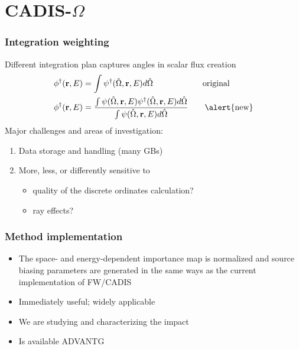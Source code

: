 \documentclass[handout]{beamer}
\renewcommand{\(}{\begin{columns}}
\renewcommand{\)}{\end{columns}}
\newcommand{\<}[1]{\begin{column}{#1}}
\renewcommand{\>}{\end{column}}
\newcommand{\vOmega}{\ensuremath{\hat{\Omega}}}
\newcommand{\ve}[1]{\ensuremath{\mathbf{#1}}}
\begin{document}
\section{\scshape CADIS-$\Omega$}
\begin{frame}[fragile]
  \frametitle{Integration weighting}

    Different integration plan captures angles in scalar flux creation	
	\begin{align*}
		\phi^{\dagger}(\ve{r},E) &= \int \psi^{\dagger}(\vOmega, 
		\ve{r},E) d\vOmega \qquad  \qquad \qquad \text{original}\\
		\phi^{\dagger}(\ve{r},E) &= \frac{\int \psi(\vOmega, \ve{r},E)
		 \psi^{\dagger}(\vOmega, \ve{r},E) d\vOmega}{\int \psi(\vOmega, 
		 \ve{r},E)  d\vOmega} \qquad \text{\alert{new}}
	\end{align*}
    \pause
    Major challenges and areas of investigation:
	\begin{enumerate}
	\item Data storage and handling (many GBs)
	\item More, less, or differently sensitive to 
	  \begin{itemize}
	  \item quality of the discrete ordinates calculation?
	  \item ray effects?
	  \end{itemize}
	\end{enumerate}

\end{frame}


\begin{frame}[fragile]
  \frametitle{Method implementation}

  	\begin{itemize}
    \item The space- and energy-dependent importance map is normalized and 
     source biasing parameters are generated in the \alert{same ways} as
     the current implementation of FW/CADIS \vspace*{1 em}
	\item Immediately useful; widely applicable \vspace*{1 em}
	\item We are studying and characterizing the impact\vspace*{1 em}
	\item Is available ADVANTG \cite{mosher_new_2010}
	\end{itemize}
	
\end{frame}
\end{document}
